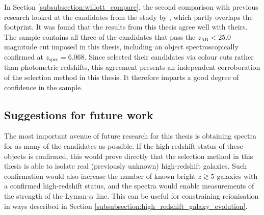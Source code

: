 In Section \ref{subsubsection:willott_compare}, the second comparison with previous research looked at the candidates from the study by \cite{2013AJ....145....4W}, which partly overlaps the \DESVIDEO footprint. It was found that the results from this thesis agree well with theirs. The \DESVIDEO sample contains all three of the \cite{2013AJ....145....4W} candidates that pass the $z_{\mathrm{AB}}<25.0$ magnitude cut imposed in this thesis, including an object spectroscopically confirmed at $z_{\mathrm{spec}}=6.068$.  Since \cite{2013AJ....145....4W} selected their candidates via colour cuts rather than photometric redshifts, this agreement presents an independent corroboration of the selection method in this thesis. It therefore imparts a good degree of confidence in the \DESVIDEO sample. \par



\subsection{Suggestions for future work}
The most important avenue of future research for this thesis is obtaining spectra for as many of the \DESVIDEO candidates as possible. If the high-redshift status of these objects is confirmed, this would prove directly that the selection method in this thesis is able to isolate real (previously unknown) high-redshift galaxies. Such confirmation would also increase the number of known bright $z\gtrsim5$ galaxies with a confirmed high-redshift status, and the spectra would enable measurements of the strength of the Lyman-$\alpha$ line. This can be useful for constraining reionisation in ways described in Section \ref{subsubsection:high_redshift_galaxy_evolution}. \par

